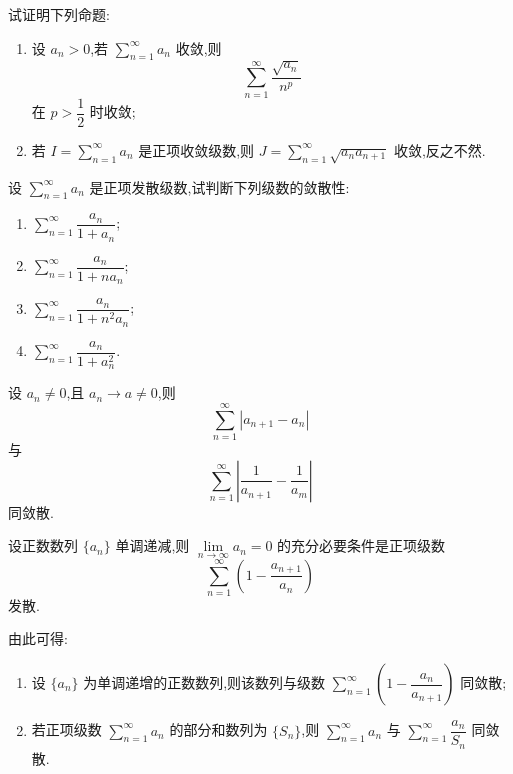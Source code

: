 \documentclass[../数学分析培优讲义.tex]{subfiles}
\begin{document}
\begin{example}
试证明下列命题:
\begin{enumerate}[label=(\arabic*)]
    \item 设 $a_n>0$,若 $\displaystyle\sum\limits_{n=1}^{\infty}a_n$ 收敛,则
    \[
        \sum\limits_{n=1}^{\infty}\dfrac{\sqrt{a_n}}{n^p}
    \]
    在 $p>\dfrac{1}{2}$ 时收敛;
    \item 若 $\displaystyle I=\sum\limits_{n=1}^{\infty}a_n$ 是正项收敛级数,则 $\displaystyle J=\sum\limits_{n=1}^{\infty}\sqrt{a_na_{n+1}}$ 收敛,反之不然.
\end{enumerate}
\end{example}
\exampleblank

\begin{example}
设 $\displaystyle\sum\limits_{n=1}^{\infty}a_n$ 是正项发散级数,试判断下列级数的敛散性:
\begin{enumerate}[label=(\arabic*)]
    \item $\displaystyle\sum\limits_{n=1}^{\infty}\dfrac{a_n}{1+a_n}$;
    \item $\displaystyle\sum\limits_{n=1}^{\infty}\dfrac{a_n}{1+na_n}$;
    \item $\displaystyle\sum\limits_{n=1}^{\infty}\dfrac{a_n}{1+n^2a_n}$;
    \item $\displaystyle\sum\limits_{n=1}^{\infty}\dfrac{a_n}{1+a_n^2}$.
\end{enumerate}
\end{example}
\exampleblank

\begin{example}
设 $a_n\neq0$,且 $a_n\to a\neq0$,则
\[
    \sum\limits_{n=1}^{\infty}|a_{n+1}-a_n|
\]
与
\[
    \sum\limits_{n=1}^{\infty}\left|\dfrac{1}{a_{n+1}}-\dfrac{1}{a_m}\right|
\]
同敛散.
\end{example}
\exampleblank

\begin{example}
设正数数列 $\{a_n\}$ 单调递减,则 $\displaystyle\lim\limits_{n\to\infty}a_n=0$ 的充分必要条件是正项级数
\[
    \sum\limits_{n=1}^{\infty}\left(1-\dfrac{a_{n+1}}{a_n}\right)
\]
发散.
\end{example}
\exampleblank

\begin{remark}
由此可得:
\begin{enumerate}[label=\textcircled{\arabic*}]
    \item 设 $\{a_n\}$ 为单调递增的正数数列,则该数列与级数 $\displaystyle\sum\limits_{n=1}^{\infty}\left(1-\dfrac{a_n}{a_{n+1}}\right)$ 同敛散;
    \item 若正项级数 $\displaystyle\sum\limits_{n=1}^{\infty}a_n$ 的部分和数列为 $\{S_n\}$,则 $\displaystyle\sum\limits_{n=1}^{\infty}a_n$ 与 $\displaystyle\sum\limits_{n=1}^{\infty}\dfrac{a_n}{S_n}$ 同敛散.
\end{enumerate}
\end{remark}
\end{document}
